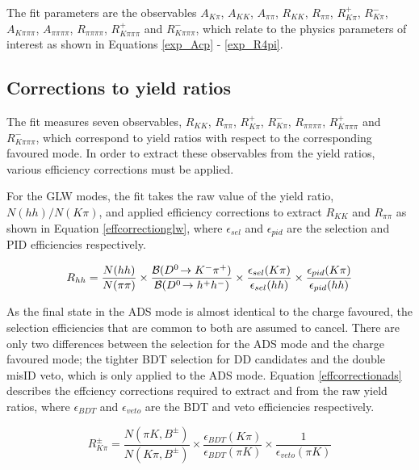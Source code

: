 The \CP fit parameters are the \CP observables $A_{K\pi}$, $A_{KK}$, $A_{\pi\pi}$, $R_{KK}$, $R_{\pi\pi}$, $R^+_{K\pi}$, $R^-_{K\pi}$, $A_{K\pi\pi\pi}$, $A_{\pi\pi\pi\pi}$, $R_{\pi\pi\pi\pi}$, $R^+_{K\pi\pi\pi}$ and $R^-_{K\pi\pi\pi}$, which relate to the physics parameters of interest as shown in Equations \ref{exp_Acp} - \ref{exp_R4pi}.

\subsection{Corrections to yield ratios}
\label{sec:cpfit:efficiencies}

The \CP fit measures seven observables, $R_{KK}$, $R_{\pi\pi}$, $R^+_{K\pi}$, $R^-_{K\pi}$, $R_{\pi\pi\pi\pi}$, $R^+_{K\pi\pi\pi}$ and $R^-_{K\pi\pi\pi}$, which correspond to yield ratios with respect to the corresponding favoured mode. In order to extract these \CP observables from the yield ratios, various efficiency corrections must be applied.

For the GLW modes, the fit takes the raw value of the yield ratio, $N(hh)/N(K\pi)$, and applied efficiency corrections to extract $R_{KK}$ and $R_{\pi\pi}$ as shown in Equation \ref{effcorrectionglw}, where $\epsilon_{sel}$ and $\epsilon_{pid}$ are the selection and PID efficiencies respectively. 

\begin{equation}
R_{hh} = \frac{N(hh)}{N(\pi\pi)} \times \frac{{\mathcal{B}}({{D}^0}\!\rightarrow {\ensuremath{{K}^-}}{\ensuremath{{\pi}^+}})}{{\mathcal{B}}({{D}^0}\!\rightarrow h^+h^-)} \times \frac{\epsilon_{sel}(K\pi)}{\epsilon_{sel}(hh)} \times \frac{\epsilon_{pid}(K\pi)}{\epsilon_{pid}(hh)}
\label{effcorrectionglw}
\end{equation}

As the final state in the ADS mode is almost identical to the charge favoured, the selection efficiencies that are common to both are assumed to cancel. There are only two differences between the selection for the ADS mode and the charge favoured mode; the tighter BDT selection for DD candidates and the double misID veto, which is only applied to the ADS mode. Equation \ref{effcorrectionads} describes the effciency corrections required to extract \Rptwo and \Rmtwo from the raw yield ratios, where $\epsilon_{BDT}$ and $\epsilon_{veto}$ are the BDT and veto efficiencies respectively.

\begin{equation}
R^{\pm}_{K\pi} = \frac{N(\pi K, B^{\pm})}{N(K\pi, B^{\pm})} \times \frac{\epsilon_{BDT}(K\pi)}{\epsilon_{BDT}(\pi K)} \times \frac{1}{\epsilon_{veto}(\pi K)}
\label{effcorrectionads}
\end{equation}


